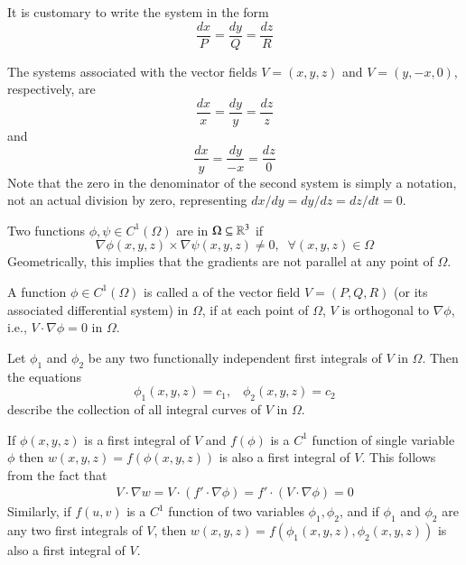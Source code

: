 \documentclass[12pt, a4paper, oneside, openright, titlepage]{book}
\begin{document}
\begin{appendices}
    It is customary to write the system in the form \begin{equation*}
        \frac{dx}{P} = \frac{dy}{Q} = \frac{dz}{R}
    \end{equation*}

    \begin{eg}
        The systems associated with the vector fields $V = (x,y,z)$ and $V = (y,-x,0)$, respectively, are $$\frac{dx}{x} = \frac{dy}{y} = \frac{dz}{z}$$ and $$\frac{dx}{y} = \frac{dy}{-x} = \frac{dz}{0}$$ Note that the zero in the denominator of the second system is simply a notation, not an actual division by zero, representing $dx/dy = dy/dz = dz/dt = 0$.
    \end{eg}

    \begin{defn}
        Two functions $\phi,\psi \in C^1(\Omega)$ are  in $\Omega \subseteq \mathbb R^3$ if \begin{equation*}
            \nabla \phi(x,y,z)\times \nabla\psi(x,y,z) \neq 0,\;\;\forall (x,y,z) \in \Omega
        \end{equation*}
        Geometrically, this implies that the gradients are not parallel at any point of $\Omega$.
    \end{defn}

    \begin{defn}
        A function $\phi \in C^1(\Omega)$ is called a  of the vector field $V= (P,Q,R)$ (or its associated differential system) in $\Omega$, if at each point of $\Omega$, $V$ is orthogonal to $\nabla \phi$, i.e., $V\cdot \nabla \phi = 0$ in $\Omega$.
    \end{defn}

    \begin{thm}
        Let $\phi_1$ and $\phi_2$ be any two functionally independent first integrals of $V$ in $\Omega$. Then the equations \begin{equation*}
            \phi_1(x,y,z) = c_1,\;\;\;\phi_2(x,y,z) = c_2
        \end{equation*}
        describe the collection of all integral curves of $V$ in $\Omega$.
    \end{thm}


    If $\phi(x,y,z)$ is a first integral of $V$ and $f(\phi)$ is a $C^1$ function of single variable $\phi$ then $w(x,y,z) = f(\phi(x,y,z))$ is also a first integral of $V$. This follows from the fact that \begin{align*}
        V \cdot \nabla w = V \cdot (f'\cdot \nabla \phi) = f'\cdot(V\cdot \nabla \phi) = 0
    \end{align*}
    Similarly, if $f(u,v)$ is a $C^1$ function of two variables $\phi_1,\phi_2$, and if $\phi_1$ and $\phi_2$ are any two first integrals of $V$, then $w(x,y,z) = f(\phi_1(x,y,z),\phi_2(x,y,z))$ is also a first integral of $V$.


\end{appendices}
\end{document}
